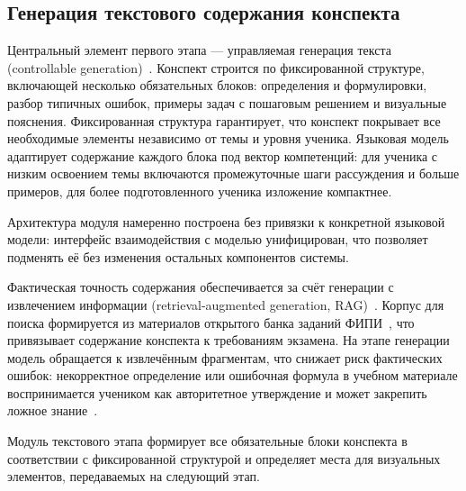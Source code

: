 \subsection{Генерация текстового содержания конспекта}

Центральный элемент первого этапа --- управляемая генерация текста
(controllable generation)~\cite{Liang2024Controllable}.
Конспект строится по фиксированной структуре, включающей несколько обязательных
блоков: определения и формулировки, разбор типичных ошибок, примеры задач
с пошаговым решением и визуальные пояснения. Фиксированная структура
гарантирует, что конспект покрывает все необходимые элементы независимо от
темы и уровня ученика. Языковая модель адаптирует содержание каждого блока
под вектор компетенций: для ученика с низким освоением темы включаются
промежуточные шаги рассуждения и больше примеров, для более подготовленного
ученика изложение компактнее.

Архитектура модуля намеренно построена без привязки к конкретной языковой
модели: интерфейс взаимодействия с моделью унифицирован, что позволяет
подменять её без изменения остальных компонентов системы.

Фактическая точность содержания обеспечивается за счёт генерации с
извлечением информации (retrieval-augmented generation,
RAG)~\cite{Lewis2020RAG}. Корпус для поиска формируется из материалов
открытого банка заданий ФИПИ~\cite{FIPI2025Bank}, что привязывает содержание
конспекта к требованиям экзамена. На этапе генерации модель обращается к
извлечённым фрагментам, что снижает риск фактических ошибок: некорректное
определение или ошибочная формула в учебном материале воспринимается учеником
как авторитетное утверждение и может закрепить ложное
знание~\cite{HallucinationSurvey2023}.

Модуль текстового этапа формирует все обязательные блоки конспекта в
соответствии с фиксированной структурой и определяет места для визуальных
элементов, передаваемых на следующий этап.

